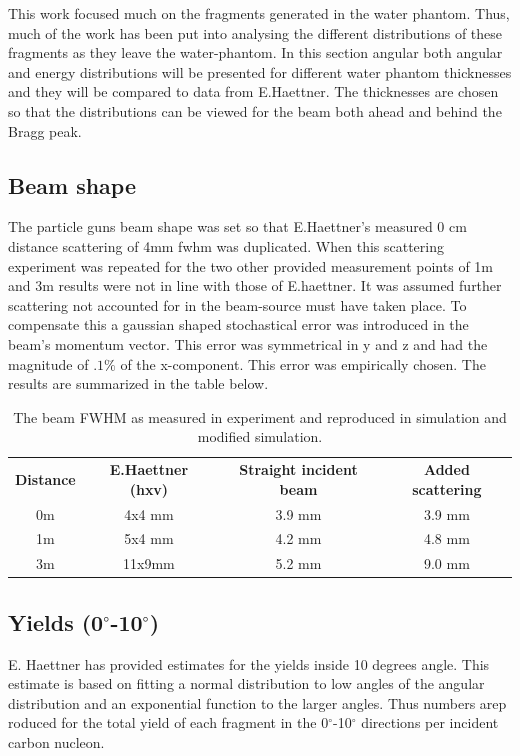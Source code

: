 This work focused much on the fragments generated in the water phantom. Thus, much of the work has been put into analysing the different distributions of these fragments as they leave the water-phantom. In this section angular both angular and energy distributions will be presented for different water phantom thicknesses and they will be compared to data from E.Haettner. The thicknesses are chosen so that the distributions can be viewed for the beam both ahead and behind the Bragg peak.

\subsection{Beam shape\label{beamShapeAnalysis}}
The particle guns beam shape was set so that E.Haettner's measured 0 cm distance scattering of 4mm fwhm was duplicated. When this scattering experiment was repeated for the two other provided measurement points of 1m and 3m results were not in line with those of E.haettner. It was assumed further scattering not accounted for in the beam-source must have taken place. To compensate this a gaussian shaped stochastical error was introduced in the beam's momentum vector. This error was symmetrical in y and z and had the magnitude of $.1 \%$ of the x-component. This error was empirically chosen. The results are summarized in the table below.
\begin{center}
 \begin{table}[h]
\begin{tabular}{cccc} %
\textbf{Distance} & \textbf{E.Haettner (hxv)} & \textbf{Straight incident beam} & \textbf{Added scattering} \\
0m &4x4 mm& 3.9 mm & 3.9 mm\\
1m &5x4 mm & 4.2 mm & 4.8 mm\\
3m &11x9mm& 5.2 mm & 9.0 mm\\
\end{tabular} 
\caption{\label{fig:beamFWHMtable} The beam FWHM as measured in experiment and reproduced in simulation and modified simulation.}
\end{table}
\end{center}

\subsection{Yields (0$^\circ$-10$^\circ$)}
E. Haettner has provided estimates for the yields inside 10 degrees angle. This estimate is based on fitting a normal distribution to low angles of the angular distribution and an exponential function to the larger angles. Thus numbers arep roduced for the total yield of each fragment in the 0$^\circ$-10$^\circ$ directions per incident carbon nucleon.

